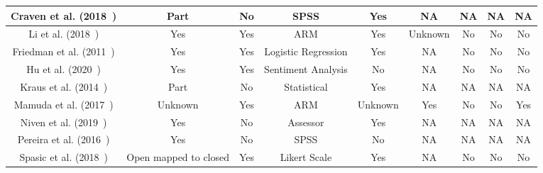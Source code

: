 \begin{landscape}
\begin{table}[htbp]
\begin{adjustwidth}{-2cm}{}
\begin{tabular}{|c|c|c|c|c|c|c|c|c|}
                \hline
                Craven et al. (2018~\cite{craven2018community})          & Part                   & No                & SPSS                & Yes              & NA                  & NA                 & NA                & NA                      \\
                \hline
                Li et al. (2018~\cite{li2018development})                & Yes                    & Yes               & ARM                 & Yes              & Unknown             & No                 & No                & No                      \\
                \hline
                Friedman et al. (2011~\cite{friedman2012predicting})     & Yes                    & Yes               & Logistic Regression & Yes              & NA                  & No                 & No                & No                      \\
                \hline
                Hu et al. (2020~\cite{hu2020optimizing})                 & Yes                    & Yes               & Sentiment Analysis  & No               & NA                  & No                 & No                & No                      \\
                \hline
                Kraus et al. (2014~\cite{krause2014identifying})         & Part                   & No                & Statistical         & Yes              & NA                  & NA                 & NA                & NA                      \\
                \hline
                Mamuda et al. (2017~\cite{mamuda2017fusion})             & Unknown                & Yes               & ARM                 & Unknown          & Yes                 & No                 & No                & Yes                     \\
                \hline
                Niven et al. (2019~\cite{niven2019cigarette})            & Yes                    & No                & Assessor            & Yes              & NA                  & NA                 & NA                & NA                      \\
                \hline
                Pereira et al. (2016~\cite{pereira2016students})         & Yes                    & No                & SPSS                & No               & NA                  & NA                 & NA                & NA                      \\
                \hline
                Spasic et al. (2018~\cite{spasic2018closing})            & Open mapped to closed  & Yes               & Likert Scale        & Yes              & NA                  & No                 & No                & No                      \\

\end{tabular}
\end{adjustwidth}
\end{table}
\end{landscape}
